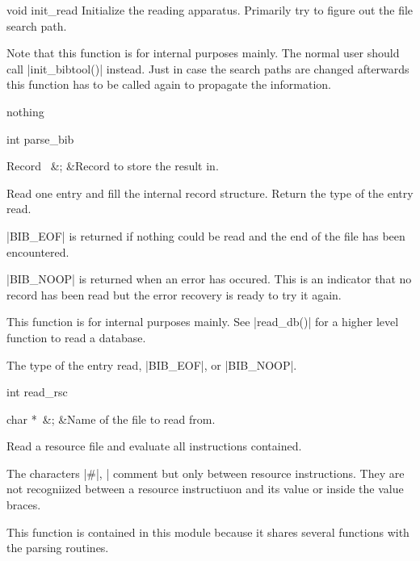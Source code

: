 
\begin{Function}{void }{init\_read}  Initialize the reading apparatus.
  Primarily try to figure out the file search path.
  
  Note that this function is for internal purposes
  mainly. The normal user should call |init_bibtool()|
  instead. Just in case the search paths are changed
  afterwards this function has to be called again to
  propagate the information.
  \begin{Result}
    nothing
  \end{Result}
\end{Function}
\begin{Function}{int }{parse\_bib}
  \begin{Arguments}
    Record \ 	&;	&Record to store the result in.
  \end{Arguments}%
  Read one entry and fill the internal record structure.
  Return the type of the entry read.
  
  |BIB_EOF| is returned if nothing could be read and
  the end of the file has been encountered.
  
  |BIB_NOOP| is returned when an error has occured. This is
  an indicator that no record has been read but the
  error recovery is ready to try it again.
  
  This function is for internal purposes mainly. See
  |read_db()| for a higher level function to read a
  database. 
  \begin{Result}
    The type of the entry read, |BIB_EOF|, or |BIB_NOOP|.
  \end{Result}
\end{Function}
\begin{Function}{int }{read\_rsc}
  \begin{Arguments}
    char *\ 	&;	&Name of the file to read from.
  \end{Arguments}%
  Read a resource file and evaluate all instructions
  contained.
  
  The characters |#|, |%
  comment but only between resource instructions. They
  are not recogniized between a resource instructiuon
  and its value or inside the value braces.
  
  This function is contained in this module because it
  shares several functions with the \BibTeX{} parsing
  routines. 
  \begin{Result}
    
  \end{Result}
\end{Function}
